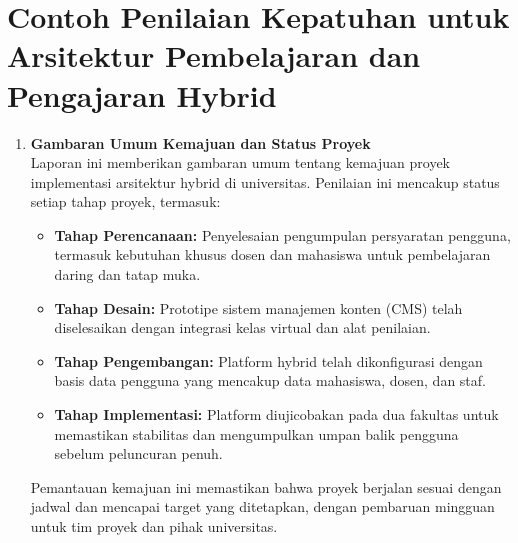\section{Contoh Penilaian Kepatuhan untuk Arsitektur Pembelajaran dan Pengajaran Hybrid }
\label{sec:contoh_penilaian_kepatuhan}
\begin{enumerate}
	
	 \item \textbf{Gambaran Umum Kemajuan dan Status Proyek} \\
	Laporan ini memberikan gambaran umum tentang kemajuan proyek implementasi arsitektur hybrid di universitas. Penilaian ini mencakup status setiap tahap proyek, termasuk:
	\begin{itemize}
		\item \textbf{Tahap Perencanaan:} Penyelesaian pengumpulan persyaratan pengguna, termasuk kebutuhan khusus dosen dan mahasiswa untuk pembelajaran daring dan tatap muka.
		\item \textbf{Tahap Desain:} Prototipe sistem manajemen konten (CMS) telah diselesaikan dengan integrasi kelas virtual dan alat penilaian.
		\item \textbf{Tahap Pengembangan:} Platform hybrid telah dikonfigurasi dengan basis data pengguna yang mencakup data mahasiswa, dosen, dan staf.
		\item \textbf{Tahap Implementasi:} Platform diujicobakan pada dua fakultas untuk memastikan stabilitas dan mengumpulkan umpan balik pengguna sebelum peluncuran penuh.
	\end{itemize}
	Pemantauan kemajuan ini memastikan bahwa proyek berjalan sesuai dengan jadwal dan mencapai target yang ditetapkan, dengan pembaruan mingguan untuk tim proyek dan pihak universitas.
	

\end{enumerate}
